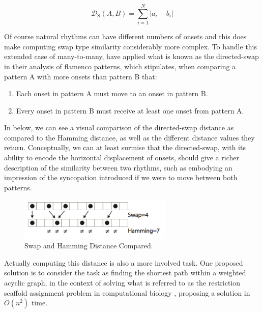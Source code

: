 \begin{equation}
\label{eq:swap}
	\mathcal{D}_\mathrm{S}(A,B) = {\sum_{i=1}^{N}|a_i-b_i|}	
\end{equation}

Of course natural rhythms can have different numbers of onsets and this does make computing swap type similarity considerably more complex. To handle this extended case of many-to-many, \cite{Diaz-Banez2004} have applied what is known as the directed-swap in their analysis of flamenco patterns, which stipulates, when comparing a pattern A with more onsets than pattern B that:

\begin{enumerate}
	\item Each onset in pattern A must move to an onset in pattern B.
	\item Every onset in pattern B must receive at least one onset from pattern A.
\end{enumerate}

In  below, we can see a visual comparison of the directed-swap distance as compared to the Hamming distance, as well as the different distance values they return. Conceptually, we can at least surmise that the directed-swap, with its ability to encode the horizontal displacement of onsets, should give a richer description of the similarity between two rhythms, such as embodying an impression of the syncopation introduced if we were to move between both patterns.

\begin{figure}
	\begin{center}
		\includegraphics[width=0.65\textwidth]{ch03_symbolic/figures/swap_vs_hamming.png}
	\end{center}
	\caption[Swap and Hamming Distance Compared.]{Swap and Hamming Distance Compared.}
	\label{fig:swapvshamming}
\end{figure}

Actually computing this distance is also a more involved task. One proposed solution is to consider the task as finding the shortest path within a weighted acyclic graph, in the context of solving what is referred to as the restriction scaffold assignment problem in computational biology \citep{Colannino2005}, proposing a solution in $O(n^{2})$ time.


